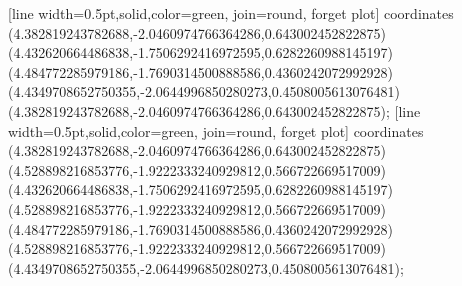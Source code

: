 [line width=0.5pt,solid,color=green, join=round, forget plot] coordinates {(4.382819243782688,-2.0460974766364286,0.643002452822875) (4.432620664486838,-1.7506292416972595,0.6282260988145197) (4.484772285979186,-1.7690314500888586,0.4360242072992928) (4.4349708652750355,-2.0644996850280273,0.4508005613076481) (4.382819243782688,-2.0460974766364286,0.643002452822875)};
[line width=0.5pt,solid,color=green, join=round, forget plot] coordinates {(4.382819243782688,-2.0460974766364286,0.643002452822875) (4.528898216853776,-1.9222333240929812,0.566722669517009) (4.432620664486838,-1.7506292416972595,0.6282260988145197) (4.528898216853776,-1.9222333240929812,0.566722669517009) (4.484772285979186,-1.7690314500888586,0.4360242072992928) (4.528898216853776,-1.9222333240929812,0.566722669517009) (4.4349708652750355,-2.0644996850280273,0.4508005613076481)};

